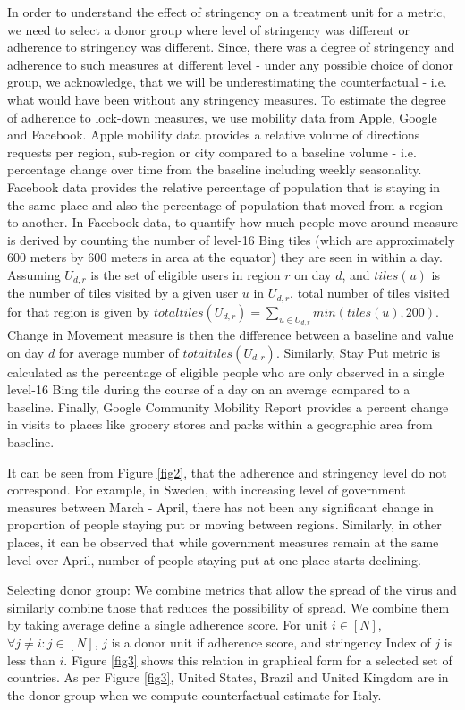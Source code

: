 \documentclass[preprint,authoryear,12pt]{elsarticle}
\begin{document}
    In order to understand the effect of stringency on a treatment unit for a metric, we need to select a donor group where level of stringency was different or adherence to stringency was different. Since, there was a degree of stringency and adherence to such measures at different level - under any possible choice of donor group, we acknowledge, that we will be underestimating the counterfactual - i.e. what would have been without any stringency measures. To estimate the degree of adherence to lock-down measures, we use mobility data from Apple, Google and Facebook. Apple mobility data provides a relative volume of directions requests per region, sub-region or city compared to a baseline volume - i.e. percentage change over time from the baseline including weekly seasonality. Facebook data provides the relative percentage of population that is staying in the same place and also the percentage of population that moved from a region to another.  In Facebook data, to quantify how much people move around measure is derived by counting the number of level-16 Bing tiles (which are approximately 600 meters by 600 meters in area at the equator) they are seen in within a day. Assuming $U_{d,r}$ is the set of eligible users in region $r$ on day $d$, and $tiles(u)$ is the number of tiles visited by a given user $u$ in $U_{d,r}$, total number of tiles visited for that region is given by $totaltiles(U_{d,r}) = \sum_{u \in U_{d,r}} min(tiles(u), 200)$. Change in Movement measure is then the difference between a baseline and value on day $d$ for average number of $totaltiles(U_{d,r})$. Similarly, Stay Put metric is calculated as the percentage of eligible people who are only observed in a single level-16 Bing tile during the course of a day on an average compared to a baseline. Finally, Google Community Mobility Report provides a percent change in visits to places like grocery stores and parks within a geographic area from baseline.
    
    It can be seen from Figure \ref{fig2}, that the adherence  and stringency level do not correspond. For example, in Sweden, with increasing level of government measures between March - April, there has not been any significant change in proportion of people staying put or moving between regions. Similarly, in other places, it can be observed that while government measures remain at the same level over April, number of people staying put at one place starts declining. 
    
    Selecting donor group: We combine metrics that allow the spread of the virus and similarly combine those that reduces the possibility of spread. We combine them by taking average define a single adherence score. For unit $i \in [N]$, $\forall j \neq i : j \in [N]$, $j$ is a donor unit if adherence score, and stringency Index of $j$ is less than $i$. Figure \ref{fig3} shows this relation in graphical form for a selected set of countries. As per Figure \ref{fig3}, United States, Brazil and United Kingdom are in the donor group when we compute counterfactual estimate for Italy. 
    
\end{document}
